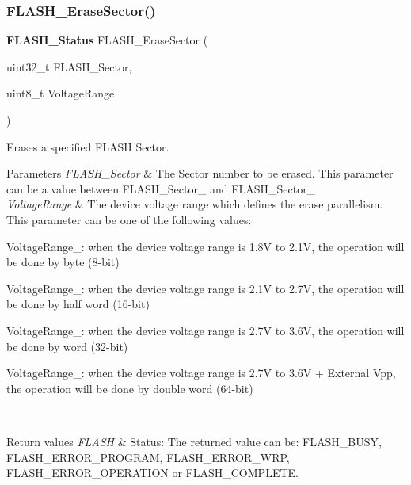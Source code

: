 \subsubsection{F\+L\+A\+S\+H\+\_\+\+Erase\+Sector()}
{\footnotesize\ttfamily \textbf{ F\+L\+A\+S\+H\+\_\+\+Status} F\+L\+A\+S\+H\+\_\+\+Erase\+Sector (\begin{DoxyParamCaption}\item[{uint32\+\_\+t}]{F\+L\+A\+S\+H\+\_\+\+Sector,  }\item[{uint8\+\_\+t}]{Voltage\+Range }\end{DoxyParamCaption})}



Erases a specified F\+L\+A\+SH Sector. 


\begin{DoxyParams}{Parameters}
{\em F\+L\+A\+S\+H\+\_\+\+Sector} & The Sector number to be erased. This parameter can be a value between F\+L\+A\+S\+H\+\_\+\+Sector\+\_ and F\+L\+A\+S\+H\+\_\+\+Sector\+\_\\
\hline
{\em Voltage\+Range} & The device voltage range which defines the erase parallelism. This parameter can be one of the following values\+: \begin{DoxyItemize}
\item Voltage\+Range\+\_\+: when the device voltage range is 1.\+8V to 2.\+1V, the operation will be done by byte (8-\/bit) \item Voltage\+Range\+\_\+: when the device voltage range is 2.\+1V to 2.\+7V, the operation will be done by half word (16-\/bit) \item Voltage\+Range\+\_\+: when the device voltage range is 2.\+7V to 3.\+6V, the operation will be done by word (32-\/bit) \item Voltage\+Range\+\_\+: when the device voltage range is 2.\+7V to 3.\+6V + External Vpp, the operation will be done by double word (64-\/bit)\end{DoxyItemize}
\\
\hline
\end{DoxyParams}

\begin{DoxyRetVals}{Return values}
{\em F\+L\+A\+SH} & Status\+: The returned value can be\+: F\+L\+A\+S\+H\+\_\+\+B\+U\+SY, F\+L\+A\+S\+H\+\_\+\+E\+R\+R\+O\+R\+\_\+\+P\+R\+O\+G\+R\+AM, F\+L\+A\+S\+H\+\_\+\+E\+R\+R\+O\+R\+\_\+\+W\+RP, F\+L\+A\+S\+H\+\_\+\+E\+R\+R\+O\+R\+\_\+\+O\+P\+E\+R\+A\+T\+I\+ON or F\+L\+A\+S\+H\+\_\+\+C\+O\+M\+P\+L\+E\+TE. \\
\hline
\end{DoxyRetVals}


